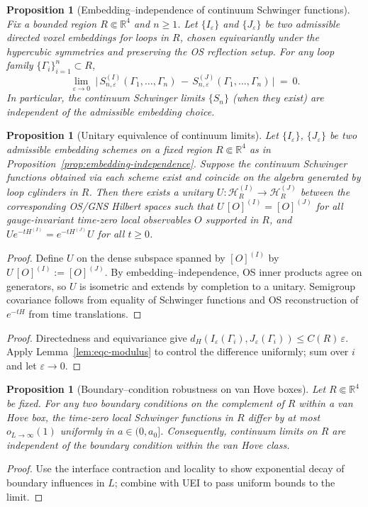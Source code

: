 \documentclass[11pt]{amsart}
\theoremstyle{plain}
\newtheorem{proposition}[theorem]{Proposition}
\theoremstyle{definition}
\theoremstyle{remark}
\begin{document}
\begin{proposition}[Embedding–independence of continuum Schwinger functions]\label{prop:embedding-independence-app}
Fix a bounded region $R\Subset\mathbb R^4$ and $n\ge 1$. Let $\{I_\varepsilon\}$ and $\{J_\varepsilon\}$ be two admissible directed voxel embeddings for loops in $R$, chosen equivariantly under the hypercubic symmetries and preserving the OS reflection setup. For any loop family $\{\Gamma_i\}_{i=1}^n\subset R$,
\[
  \lim_{\varepsilon\to 0}\ \Big|\, S_{n,\varepsilon}^{(I)}(\Gamma_1,\dots,\Gamma_n)\,-\,S_{n,\varepsilon}^{(J)}(\Gamma_1,\dots,\Gamma_n)\,\Big|\ =\ 0.
\]
In particular, the continuum Schwinger limits $\{S_n\}$ (when they exist) are independent of the admissible embedding choice.
\end{proposition}
\begin{proposition}[Unitary equivalence of continuum limits]\label{prop:unitary-equivalence}
Let $\{I_\varepsilon\}$, $\{J_\varepsilon\}$ be two admissible embedding schemes on a fixed region $R\Subset\mathbb R^4$ as in Proposition~\ref{prop:embedding-independence}. Suppose the continuum Schwinger functions obtained via each scheme exist and coincide on the algebra generated by loop cylinders in $R$. Then there exists a unitary $U: \mathcal H^{(I)}_R \to \mathcal H^{(J)}_R$ between the corresponding OS/GNS Hilbert spaces such that $U\,[O]^{(I)} = [O]^{(J)}$ for all gauge-invariant time-zero local observables $O$ supported in $R$, and $U e^{-tH^{(I)}} = e^{-tH^{(J)}} U$ for all $t\ge 0$.
\end{proposition}
\begin{proof}
Define $U$ on the dense subspace spanned by $[O]^{(I)}$ by $U\,[O]^{(I)} := [O]^{(J)}$. By embedding–independence, OS inner products agree on generators, so $U$ is isometric and extends by completion to a unitary. Semigroup covariance follows from equality of Schwinger functions and OS reconstruction of $e^{-tH}$ from time translations.
\end{proof}
\begin{proof}
Directedness and equivariance give $d_H(I_\varepsilon(\Gamma_i),J_\varepsilon(\Gamma_i))\le C(R)\,\varepsilon$. Apply Lemma~\ref{lem:eqc-modulus} to control the difference uniformly; sum over $i$ and let $\varepsilon\to 0$.
\end{proof}
\begin{proposition}[Boundary–condition robustness on van Hove boxes]\label{prop:bc-robust-app}
Let $R\Subset\mathbb R^4$ be fixed. For any two boundary conditions on the complement of $R$ within a van Hove box, the time-zero local Schwinger functions in $R$ differ by at most $o_{L\to\infty}(1)$ uniformly in $a\in(0,a_0]$. Consequently, continuum limits on $R$ are independent of the boundary condition within the van Hove class.
\end{proposition}
\begin{proof}
Use the interface contraction and locality to show exponential decay of boundary influences in $L$; combine with UEI to pass uniform bounds to the limit.
\end{proof}
\end{document}
